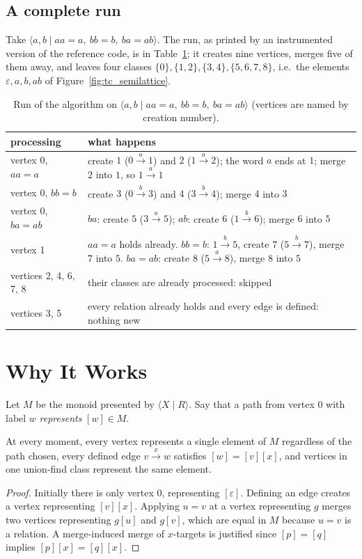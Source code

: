 \documentclass[11pt]{article}
\begin{document}
\subsection{A complete run}
Take $\langle a,b\mid aa=a,\ bb=b,\ ba=ab\rangle$. The run, as printed by an instrumented version of the reference code, is in Table~\ref{tab:trace}; it creates nine vertices, merges five of them away, and leaves four classes $\{0\},\{1,2\},\{3,4\},\{5,6,7,8\}$, i.e.\ the elements $\varepsilon,a,b,ab$ of Figure~\ref{fig:tc_semilattice}.

\begin{table}[H]
\centering
\small\sffamily\renewcommand{\arraystretch}{1.2}
\begin{tabular}{@{}p{2.6cm}p{11.8cm}@{}}
\toprule
\textbf{processing} & \textbf{what happens} \\
\midrule
vertex 0, $aa=a$ & create $1$ ($0\xrightarrow{a}1$) and $2$ ($1\xrightarrow{a}2$); the word $a$ ends at $1$; merge $2$ into $1$, so $1\xrightarrow{a}1$ \\
vertex 0, $bb=b$ & create $3$ ($0\xrightarrow{b}3$) and $4$ ($3\xrightarrow{b}4$); merge $4$ into $3$ \\
vertex 0, $ba=ab$ & $ba$: create $5$ ($3\xrightarrow{a}5$); $ab$: create $6$ ($1\xrightarrow{b}6$); merge $6$ into $5$ \\
vertex 1 & $aa=a$ holds already. $bb=b$: $1\xrightarrow{b}5$, create $7$ ($5\xrightarrow{b}7$), merge $7$ into $5$. $ba=ab$: create $8$ ($5\xrightarrow{a}8$), merge $8$ into $5$ \\
vertices 2, 4, 6, 7, 8 & their classes are already processed: skipped \\
vertices 3, 5 & every relation already holds and every edge is defined: nothing new \\
\bottomrule
\end{tabular}
\caption{Run of the algorithm on $\langle a,b\mid aa=a,\ bb=b,\ ba=ab\rangle$ (vertices are named by creation number).}
\label{tab:trace}
\end{table}

\section{Why It Works}\label{sec:proof}
Let $M$ be the monoid presented by $\langle X\mid R\rangle$. Say that a path from vertex $0$ with label $w$ \emph{represents} $[w]\in M$.

\begin{theorembox}[Invariant]
At every moment, every vertex represents a single element of $M$ regardless of the path chosen, every defined edge $v\xrightarrow{x}w$ satisfies $[w]=[v][x]$, and vertices in one union-find class represent the same element.
\end{theorembox}
\begin{proof}
Initially there is only vertex $0$, representing $[\varepsilon]$. Defining an edge creates a vertex representing $[v][x]$. Applying $u=v$ at a vertex representing $g$ merges two vertices representing $g[u]$ and $g[v]$, which are equal in $M$ because $u=v$ is a relation.
A merge-induced merge of $x$-targets is justified since $[p]=[q]$ implies $[p][x]=[q][x]$.
\end{proof}
\end{document}
